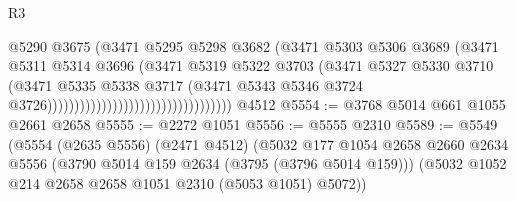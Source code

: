 \begin{lexlean}{R3}
\begin{coremodule}
                                                          @5290
                                                          @3675
                                                          (@3471
                                                            @5295
                                                            @5298
                                                            @3682
                                                            (@3471
                                                              @5303
                                                              @5306
                                                              @3689
                                                              (@3471
                                                                @5311
                                                                @5314
                                                                @3696
                                                                (@3471
                                                                  @5319
                                                                  @5322
                                                                  @3703
                                                                  (@3471
                                                                    @5327
                                                                    @5330
                                                                    @3710
                                                                    (@3471
                                                                      @5335
                                                                      @5338
                                                                      @3717
                                                                      (@3471
                                                                        @5343
                                                                        @5346
                                                                        @3724
                                                                        @3726))))))))))))))))))))))))))))))))))
    @4512
@5554 := @3768 @5014 @661 @1055 @2661 @2658
@5555 := @2272 @1051
@5556 := @5555 @2310
@5589 := @5549
    (@5554
      (@2635 @5556)
      (@2471 @4512)
      (@5032
        @177
        @1054
        @2658
        @2660
        @2634
        @5556
        (@3790 @5014 @159 @2634 (@3795 (@3796 @5014 @159)))
        (@5032 @1052 @214 @2658 @2658 @1051 @2310 (@5053 @1051) @5072))

\end{coremodule}
\end{lexlean}
